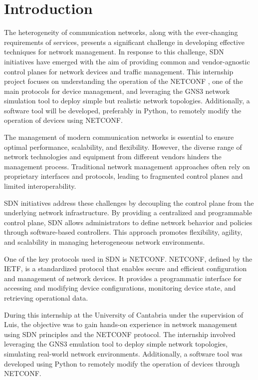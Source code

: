 \chapter{Introduction}
The heterogeneity of communication networks, along with the ever-changing requirements of services, presents a significant challenge in developing effective techniques for network management. In response to this challenge, \gls{SDN} initiatives have emerged with the aim of providing common and vendor-agnostic control planes for network devices and traffic management. This internship project focuses on understanding the operation of the \gls{NETCONF} \cite{rfc6241}, one of the main protocols for device management, and leveraging the \gls{GNS3} network simulation tool to deploy simple but realistic network topologies. Additionally, a software tool will be developed, preferably in Python, to remotely modify the operation of devices using \gls{NETCONF}.

The management of modern communication networks is essential to ensure optimal performance, scalability, and flexibility. However, the diverse range of network technologies and equipment from different vendors hinders the management process. Traditional network management approaches often rely on proprietary interfaces and protocols, leading to fragmented control planes and limited interoperability.

\gls{SDN} initiatives address these challenges by decoupling the control plane from the underlying network infrastructure. By providing a centralized and programmable control plane, \gls{SDN} allows administrators to define network behavior and policies through software-based controllers. This approach promotes flexibility, agility, and scalability in managing heterogeneous network environments.

One of the key protocols used in \gls{SDN} is \gls{NETCONF}. \gls{NETCONF}, defined by the \gls{IETF}, is a standardized protocol that enables secure and efficient configuration and management of network devices. It provides a programmatic interface for accessing and modifying device configurations, monitoring device state, and retrieving operational data.

During this internship at the University of Cantabria under the supervision of Luis, the objective was to gain hands-on experience in network management using \gls{SDN} principles and the \gls{NETCONF} protocol. The internship involved leveraging the \gls{GNS3} emulation tool to deploy simple network topologies, simulating real-world network environments. Additionally, a software tool was developed using Python to remotely modify the operation of devices through \gls{NETCONF}.


